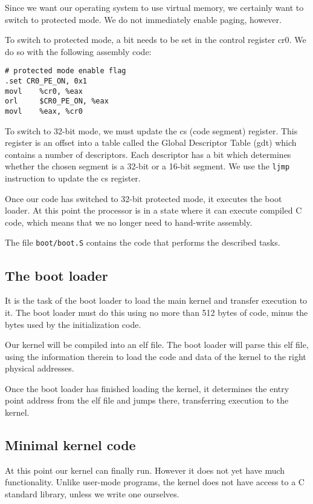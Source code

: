 \documentclass{article}
\begin{document}
Since we want our operating system to use virtual memory, we certainly want to
switch to protected mode. We do not immediately enable paging, however.

To switch to protected mode, a bit needs to be set in the control register
\gls{cr0}. We do so with the following assembly code:
\begin{verbatim}
# protected mode enable flag
.set CR0_PE_ON, 0x1 
movl    %cr0, %eax
orl     $CR0_PE_ON, %eax
movl    %eax, %cr0
\end{verbatim}

To switch to 32-bit mode, we must update the \gls{cs} (code
segment) register. This register is an offset into a table called the Global
Descriptor Table (\gls{gdt}) which contains a number of descriptors. Each
descriptor has a bit which determines whether the chosen segment is a 32-bit
or a 16-bit segment. We use the \texttt{ljmp} instruction to update the
\gls{cs} register.

Once our code has switched to 32-bit protected mode, it executes the boot
loader. At this point the processor is in a state where it can execute
compiled C code, which means that we no longer need to hand-write assembly.

The file \texttt{boot/boot.S} contains the code that performs the described
tasks.



\subsection{The boot loader}
It is the task of the boot loader to load the main kernel and transfer
execution to it. The boot loader must do this using no more than 512 bytes of
code, minus the bytes used by the initialization code.

Our kernel will be compiled into an \gls{elf} file. The boot loader will parse
this \gls{elf} file, using the information therein to load the code and data
of the kernel to the right physical addresses.


Once the boot loader has finished loading the kernel, it determines the entry
point address from the \gls{elf} file and jumps there, transferring execution to the
kernel.

\subsection{Minimal kernel code}
At this point our kernel can finally run. However it does not yet have much
functionality. Unlike user-mode programs, the kernel does not have access to a
C standard library, unless we write one ourselves.
\end{document}
